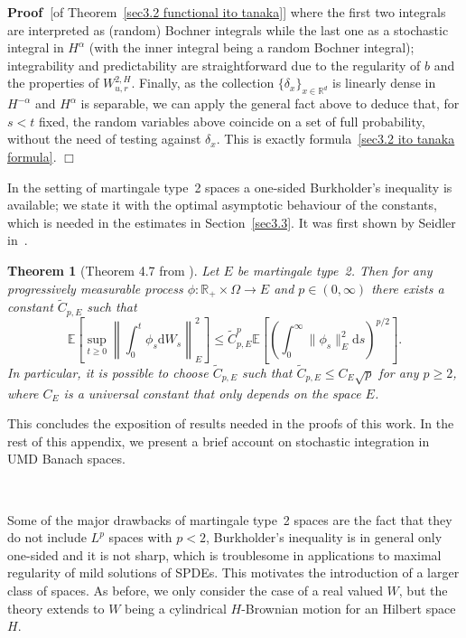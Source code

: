 \documentclass[10pt]{article}
\newcommand{\mathd}{\mathrm{d}}
\newenvironment{proof}{\noindent\textbf{Proof\ }}{\hspace*{\fill}$\Box$\medskip}
\newtheorem{theorem}{Theorem}
\begin{document}
\begin{proof}[of Theorem~\ref{sec3.2 functional ito tanaka}]
  where the first two integrals are interpreted as (random) Bochner integrals
  while the last one as a stochastic integral in $H^{\alpha}$ (with the inner
  integral being a random Bochner integral); integrability and predictability
  are straightforward due to the regularity of $b$ and the properties of
  $W^{2, H}_{u, r}$. Finally, as the collection $\{ \delta_x \}_{x \in
  \mathbb{R}^d}$ is linearly dense in $H^{- \alpha}$ and $H^{\alpha}$ is
  separable, we can apply the general fact above to deduce that, for $s < t$
  fixed, the random variables above coincide on a set of full probability,
  without the need of testing against $\delta_x$. This is exactly
  formula~{\eqref{sec3.2 ito tanaka formula}}.
\end{proof}

In the setting of martingale type~2 spaces a one-sided Burkholder's inequality
is available; we state it with the optimal asymptotic behaviour of the
constants, which is needed in the estimates in Section~\ref{sec3.3}. It was
first shown by Seidler in~{\cite{seidler}}.

\begin{theorem}[Theorem 4.7 from {\cite{vanneerven2015}}]
  \label{appendixA3 thm burkholder}Let $E$ be martingale type~2. Then for any
  progressively measurable process $\phi : \mathbb{R}_+ \times \Omega
  \rightarrow E$ and $p \in (0, \infty)$ there exists a constant
  $\tilde{C}_{p, E}$ such that
  \begin{equation}
    \mathbb{E} \left[ \sup_{t \geqslant 0} \left\| \int_0^t \phi_s \mathd W_s
    \right\|_E^2 \right] \leqslant \tilde{C}_{p, E}^p \mathbb{E} \left[ \left(
    \int_0^{\infty} \| \phi_s \|^2_E \mathd s \right)^{p / 2} \right] .
    \label{appendixA3 burkholder}
  \end{equation}
  In particular, it is possible to choose $\tilde{C}_{p, E}$ such that
  $\tilde{C}_{p, E} \leqslant C_E \sqrt{p}$ for any $p \geqslant 2$, where
  $C_E$ is a universal constant that only depends on the space $E$.
\end{theorem}

This concludes the exposition of results needed in the proofs of this work. In
the rest of this appendix, we present a brief account on stochastic
integration in UMD Banach spaces.

\

Some of the major drawbacks of martingale type~2 spaces are the fact that
they do not include $L^p$ spaces with $p < 2$, Burkholder's inequality is in
general only one-sided and it is not sharp, which is troublesome in
applications to maximal regularity of mild solutions of SPDEs. This motivates
the introduction of a larger class of spaces. As before, we only consider the
case of a real valued $W$, but the theory extends to $W$ being a cylindrical
$H$\mbox{-}Brownian motion for an Hilbert space $H$.
\end{document}
